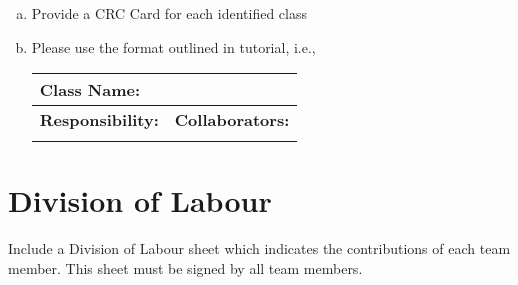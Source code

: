 \documentclass[]{article}
\begin{document}
\begin{enumerate}[a)]
	\item Provide a CRC Card for each identified class
	\item Please use the format outlined in tutorial, i.e., 
	\begin{table}[ht]
		\centering
		\begin{tabular}{|p{5cm}|p{5cm}|}
		\hline 
		 \multicolumn{2}{|l|}{\textbf{Class Name:}} \\
		\hline
		\textbf{Responsibility:} & \textbf{Collaborators:} \\
		\hline
		\vspace{1in} & \\
		\hline
		\end{tabular}
	\end{table}
	
\end{enumerate}

\appendix
\section{Division of Labour}
\label{sec:division_of_labour}
Include a Division of Labour sheet which indicates the contributions of each team member. This sheet must be signed by all team members.
\end{document}
